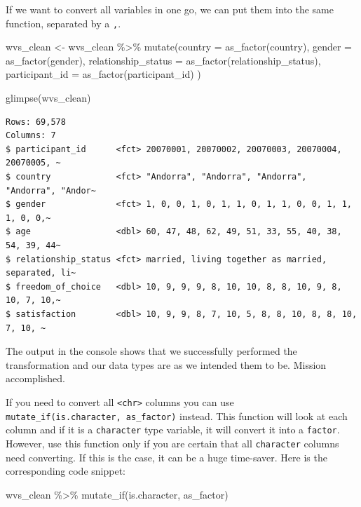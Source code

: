 \documentclass[
  letterpaper,
]{krantz}
\makeatletter
\newenvironment{Shaded}{\begin{snugshade}}{\end{snugshade}}
\newcommand{\AttributeTok}[1]{\textcolor[rgb]{0.40,0.45,0.13}{#1}}
\newcommand{\FunctionTok}[1]{\textcolor[rgb]{0.28,0.35,0.67}{#1}}
\newcommand{\NormalTok}[1]{\textcolor[rgb]{0.00,0.23,0.31}{#1}}
\newcommand{\OtherTok}[1]{\textcolor[rgb]{0.00,0.23,0.31}{#1}}
\newcommand{\SpecialCharTok}[1]{\textcolor[rgb]{0.37,0.37,0.37}{#1}}
\newenvironment{kframe}{%
\medskip{}
\setlength{\fboxsep}{.8em}
 \def\at@end@of@kframe{}%
 \ifinner\ifhmode%
  \def\at@end@of@kframe{\end{minipage}}%
  \begin{minipage}{\columnwidth}%
 \fi\fi%
 \def\FrameCommand##1{\hskip\@totalleftmargin \hskip-\fboxsep
 \colorbox{shadecolor}{##1}\hskip-\fboxsep
     \hskip-\linewidth \hskip-\@totalleftmargin \hskip\columnwidth}%
 \MakeFramed {\advance\hsize-\width
   \@totalleftmargin\z@ \linewidth\hsize
   \@setminipage}}%
 {\par\unskip\endMakeFramed%
 \at@end@of@kframe}
\renewenvironment{Shaded}{\begin{kframe}}{\end{kframe}}
\makeatother
\begin{document}
If we want to convert all variables in one go, we can put them into the
same function, separated by a \texttt{,}.

\begin{Shaded}
\begin{Highlighting}[]
\NormalTok{wvs\_clean }\OtherTok{\textless{}{-}}
\NormalTok{  wvs\_clean }\SpecialCharTok{\%\textgreater{}\%}
  \FunctionTok{mutate}\NormalTok{(}\AttributeTok{country =} \FunctionTok{as\_factor}\NormalTok{(country),}
         \AttributeTok{gender =} \FunctionTok{as\_factor}\NormalTok{(gender),}
         \AttributeTok{relationship\_status =} \FunctionTok{as\_factor}\NormalTok{(relationship\_status),}
         \AttributeTok{participant\_id =} \FunctionTok{as\_factor}\NormalTok{(participant\_id)}
\NormalTok{         )}

\FunctionTok{glimpse}\NormalTok{(wvs\_clean)}
\end{Highlighting}
\end{Shaded}

\begin{verbatim}
Rows: 69,578
Columns: 7
$ participant_id      <fct> 20070001, 20070002, 20070003, 20070004, 20070005, ~
$ country             <fct> "Andorra", "Andorra", "Andorra", "Andorra", "Andor~
$ gender              <fct> 1, 0, 0, 1, 0, 1, 1, 0, 1, 1, 0, 0, 1, 1, 1, 0, 0,~
$ age                 <dbl> 60, 47, 48, 62, 49, 51, 33, 55, 40, 38, 54, 39, 44~
$ relationship_status <fct> married, living together as married, separated, li~
$ freedom_of_choice   <dbl> 10, 9, 9, 9, 8, 10, 10, 8, 8, 10, 9, 8, 10, 7, 10,~
$ satisfaction        <dbl> 10, 9, 9, 8, 7, 10, 5, 8, 8, 10, 8, 8, 10, 7, 10, ~
\end{verbatim}

The output in the console shows that we successfully performed the
transformation and our data types are as we intended them to be. Mission
accomplished.

If you need to convert all \texttt{\textless{}chr\textgreater{}} columns
you can use \texttt{mutate\_if(is.character,\ as\_factor)} instead. This
function will look at each column and if it is a \texttt{character} type
variable, it will convert it into a \texttt{factor}. However, use this
function only if you are certain that all \texttt{character} columns
need converting. If this is the case, it can be a huge time-saver. Here
is the corresponding code snippet:

\begin{Shaded}
\begin{Highlighting}[]
\NormalTok{wvs\_clean }\SpecialCharTok{\%\textgreater{}\%}
  \FunctionTok{mutate\_if}\NormalTok{(is.character, as\_factor)}
\end{Highlighting}
\end{Shaded}
\end{document}
